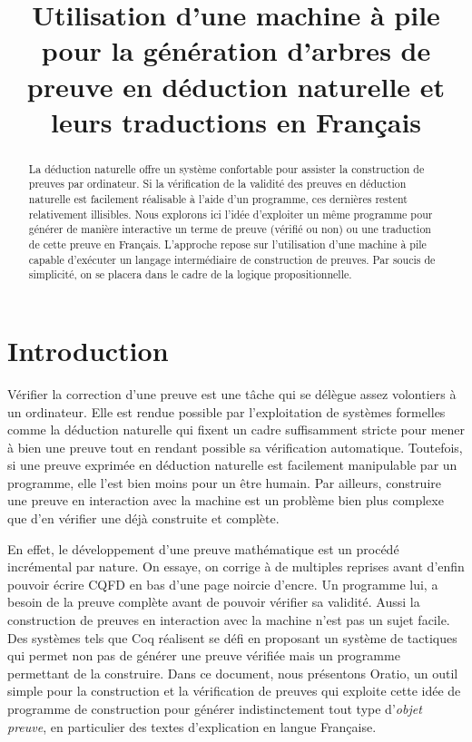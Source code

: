 \documentclass{article}
\begin{document}
\title{Utilisation d'une machine à pile pour la génération d'arbres de preuve en déduction naturelle et leurs traductions en Français}
\maketitle

\begin{abstract}
  La déduction naturelle offre un système confortable pour assister la construction de preuves par ordinateur. Si la vérification de la validité des preuves en déduction naturelle est facilement réalisable à l'aide d'un programme, ces dernières restent relativement illisibles. Nous explorons ici l'idée d'exploiter un même programme pour générer de manière interactive un terme de preuve (vérifié ou non) ou une traduction de cette preuve en Français. L'approche repose sur l'utilisation d'une machine à pile capable d'exécuter un langage intermédiaire de construction de preuves. Par soucis de simplicité, on se placera dans le cadre de la logique propositionnelle.
\end{abstract}

\section{Introduction}

Vérifier la correction d'une preuve est une tâche qui se délègue assez volontiers à un ordinateur. Elle est rendue possible par l'exploitation de systèmes formelles comme la déduction naturelle qui fixent un cadre suffisamment stricte pour mener à bien une preuve tout en rendant possible sa vérification automatique. Toutefois, si une preuve exprimée en déduction naturelle est facilement manipulable par un programme, elle l'est bien moins pour un être humain. Par ailleurs, construire une preuve en interaction avec la machine est un problème bien plus complexe que d'en vérifier une déjà construite et complète.

En effet, le développement d'une preuve mathématique est un procédé incrémental par nature. On essaye, on corrige à de multiples reprises avant d'enfin pouvoir écrire CQFD en bas d'une page noircie d'encre. Un programme lui, a besoin de la preuve complète avant de pouvoir vérifier sa validité. Aussi la construction de preuves en interaction avec la machine n'est pas un sujet facile. Des systèmes tels que Coq réalisent se défi en proposant un système de tactiques qui permet non pas de générer une preuve vérifiée mais un programme permettant de la construire. Dans ce document, nous présentons Oratio, un outil simple pour la construction et la vérification de preuves qui exploite cette idée de programme de construction pour générer indistinctement tout type d'\textit{objet preuve}, en particulier des textes d'explication en langue Française.
\end{document}
